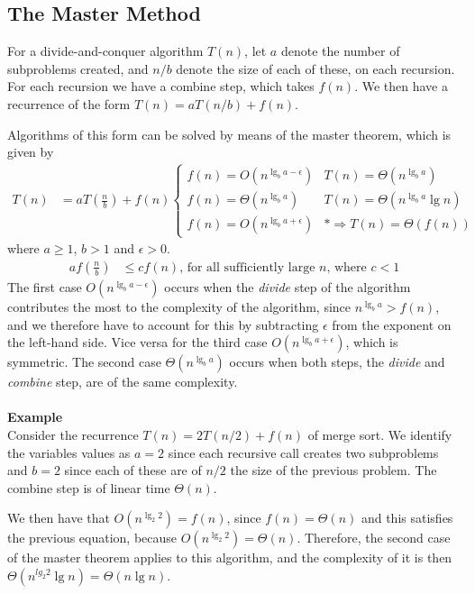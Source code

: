 \subsection{The Master Method}
For a divide-and-conquer algorithm $T(n)$, let $a$ denote the number of
subproblems created, and $n/b$ denote the size of each of these, on each
recursion. For each recursion we have a combine step, which takes $f(n)$.
We then have a recurrence of the form $T(n) = a T(n/b) + f(n)$.

Algorithms of this form can be solved by means of the master theorem, which
is given by
\begin{align}
	T(n) &= a T\left(\frac{n}{b}\right) + f(n)
	\begin{cases}
		f(n) = O(n^{\lg_b a - \epsilon}) & T(n) = \Theta(n^{\lg_b a}) \\
		f(n) = \Theta(n^{\lg_b a}) & T(n) = \Theta(n^{\lg_b a} \lg n) \\
		f(n) = O(n^{\lg_b a + \epsilon}) & * \Rightarrow T(n) = \Theta(f(n))
	\end{cases}
\end{align}
where $a \geq 1$, $b > 1$ and $\epsilon > 0$.
\begin{align}
	a f\left(\frac{n}{b}\right) &\leq c f(n)
	\text{, for all sufficiently large } n \text{, where } c < 1 \tag{*}
\end{align}
The first case $O(n^{\lg_b a - \epsilon})$ occurs when the \textit{divide}
step of the algorithm contributes the most to the complexity of the algorithm,
since $n^{\lg_b a} > f(n)$, and we therefore have to account for this by
subtracting $\epsilon$ from the exponent on the left-hand side. Vice versa for
the third case $O(n^{\lg_b a + \epsilon})$, which is symmetric. The second
case $\Theta(n^{\lg_b a})$ occurs when both steps, the \textit{divide} and
\textit{combine} step, are of the same complexity.
\\\\
\noindent \textbf{Example} \\
Consider the recurrence $T(n) = 2T(n/2) + f(n)$ of merge sort. We identify the
variables values as $a = 2$ since each recursive call creates two subproblems
and $b = 2$ since each of these are of $n/2$ the size of the previous problem.
The combine step is of linear time $\Theta(n)$.

We then have that $O(n^{\lg_2 2}) = f(n)$, since $f(n) = \Theta(n)$ and this
satisfies the previous equation, because $O(n^{\lg_2 2}) = \Theta(n)$.
Therefore, the second case of the master theorem applies to this algorithm,
and the complexity of it is then $\Theta(n^{lg_2 2}\lg n) = \Theta(n \lg n)$.




